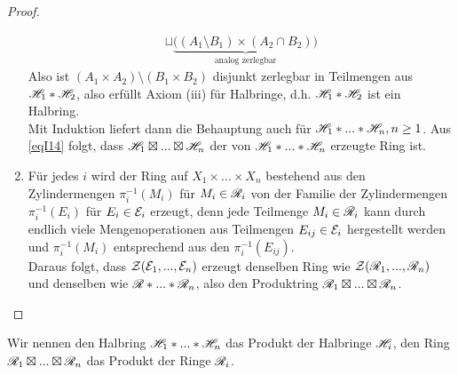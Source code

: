 \begin{proposition}
\begin{proof}
\begin{enumerate}[(\roman*),topsep=5pt]
\begin{equation*}
\begin{split}
		\sqcup \underbrace{\big( (A_1 \setminus B_1) \times (A_2 \cap B_2)\big)}_{\text{analog zerlegbar}}
	\end{split}
	\end{equation*}
	Also ist $(A_1 \times A_2) \setminus (B_1 \times B_2) $ disjunkt zerlegbar in Teilmengen aus $\mathscr{H}_1 \ast \mathscr{H}_2$, also erfüllt Axiom (iii) für Halbringe, d.h.  $\mathscr{H}_1 \ast \mathscr{H}_2$ ist ein Halbring. \\
	Mit Induktion liefert dann die Behauptung auch für $\mathscr{H}_1 \ast ... \ast \mathscr{H}_n, n\geq 1$. \newline
	Aus \eqref{eqI14} folgt, dass $\mathscr{H}_1 \boxtimes ... \boxtimes \mathscr{H}_n$ der von $\mathscr{H}_1 \ast ... \ast \mathscr{H}_n$ erzeugte Ring ist.
	\item Für jedes $i$ wird der Ring auf $X_1 \times ... \times X_n$ bestehend aus den Zylindermengen $\pi_i^{-1}(M_i)$ für $M_i \in \mathscr{R}_i$ von der Familie der Zylindermengen $\pi_i^{-1}(E_i)$ für $E_i \in \mathcal{E}_i$ erzeugt, denn jede Teilmenge $M_i \in \mathscr{R}_i$ kann durch endlich viele Mengenoperationen aus Teilmengen $E_{ij} \in \mathcal{E}_i$ hergestellt werden und $\pi^{-1}_i(M_i)$ entsprechend aus den $\pi_i^{-1}(E_{ij})$. \\
	Daraus folgt, dass $\mathcal{Z}(\mathcal{E}_1,...,\mathcal{E}_n)$ erzeugt denselben Ring wie $\mathcal{Z}( \mathscr{R}_1,...,\mathscr{R}_n)$ und denselben wie $\mathscr{R} \ast ... \ast \mathscr{R}_n$, also den Produktring $\mathscr{R}_1 \boxtimes ... \boxtimes \mathscr{R}_n$.
\end{enumerate}
\end{proof}
\end{proposition}
\begin{definition}
\begin{mdframed}
Wir nennen den Halbring $\mathscr{H}_1 \ast ... \ast \mathscr{H}_n$ das Produkt der Halbringe $\mathscr{H}_i$, den Ring $\mathscr{R}_1 \boxtimes ... \boxtimes \mathscr{R}_n$ das Produkt der Ringe $\mathscr{R}_i$.
\end{mdframed}
\end{definition}


